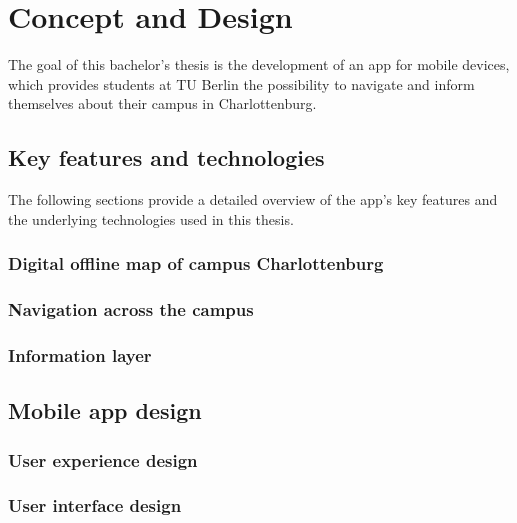 \chapter{Concept and Design}
\label{cha:conceptanddesign}
The goal of this bachelor's thesis is the development of an app for mobile devices, which provides students at TU Berlin the possibility to navigate and inform themselves about their campus in Charlottenburg. 

\section{Key features and technologies}
The following sections provide a detailed overview of the app's key features and the underlying technologies used in this thesis.

\subsection{Digital offline map of campus Charlottenburg}
\subsection{Navigation across the campus}
\subsection{Information layer}

\section{Mobile app design}
\subsection{User experience design}
\subsection{User interface design}
